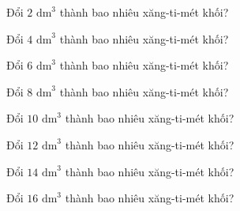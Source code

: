 
\begin{ex}
  Đổi $2\text{ dm}^3$ thành bao nhiêu xăng-ti-mét khối?
\end{ex}

\begin{ex}
  Đổi $4\text{ dm}^3$ thành bao nhiêu xăng-ti-mét khối?
\end{ex}

\begin{ex}
  Đổi $6\text{ dm}^3$ thành bao nhiêu xăng-ti-mét khối?
\end{ex}

\begin{ex}
  Đổi $8\text{ dm}^3$ thành bao nhiêu xăng-ti-mét khối?
\end{ex}

\begin{ex}
  Đổi $10\text{ dm}^3$ thành bao nhiêu xăng-ti-mét khối?
\end{ex}

\begin{ex}
  Đổi $12\text{ dm}^3$ thành bao nhiêu xăng-ti-mét khối?
\end{ex}

\begin{ex}
  Đổi $14\text{ dm}^3$ thành bao nhiêu xăng-ti-mét khối?
\end{ex}

\begin{ex}
  Đổi $16\text{ dm}^3$ thành bao nhiêu xăng-ti-mét khối?
\end{ex}

